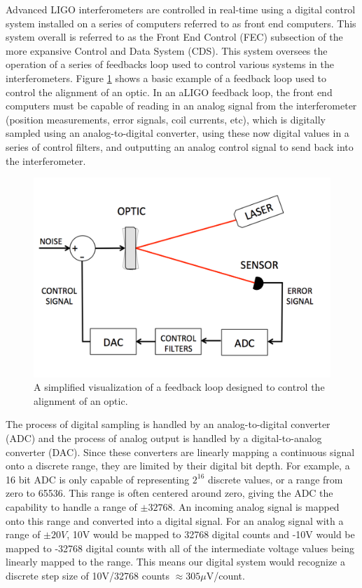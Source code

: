 Advanced LIGO interferometers are controlled in real-time using a digital 
control system installed on a series of computers referred to as front end 
computers.  This system overall is referred to as the Front End Control 
(FEC) subsection of the more expansive Control and Data System (CDS). This 
system oversees the operation of a series of feedbacks loop used to control 
various systems in the interferometers.  
Figure \ref{fig:control-loop} shows a basic example of a feedback loop 
used to control the alignment of an optic. 
In an aLIGO feedback loop, the front end computers must be capable of reading in an 
analog signal from the interferometer (position measurements, error signals, 
coil currents, etc), which is digitally sampled using an 
analog-to-digital converter, using these now 
digital values in a series of control filters, and outputting an analog 
control signal to send back into the interferometer. 

\begin{figure}[ht!]
\includegraphics[width=\textwidth]{figures/detchar/control-loop}
\caption[Example of a feedback loop]{A simplified visualization of a feedback %
         loop designed to control the alignment of an optic.}
\label{fig:control-loop}
\end{figure}

The process of digital sampling is handled by an analog-to-digital 
converter (ADC) and the process of analog output is handled by a 
digital-to-analog converter (DAC).  Since these converters are linearly 
mapping a continuous signal onto a discrete range, they are limited by 
their digital bit depth.  For example, a 16 bit ADC is only capable of 
representing $2^{16}$ discrete values, or a range from zero to 65536.  
This range is often centered around zero, giving the ADC the capability 
to handle a range of $\pm32768$.  An incoming analog signal is mapped 
onto this range and converted into a digital signal.
For an analog signal with a range of $\pm20V$, 
10V would be mapped to 32768 digital counts and -10V would be mapped 
to -32768 digital counts with all 
of the intermediate voltage values being linearly mapped to the range. This 
means our digital system would recognize a discrete step size of 
10V/32768 counts $\approx 305 \mu $V/count.

